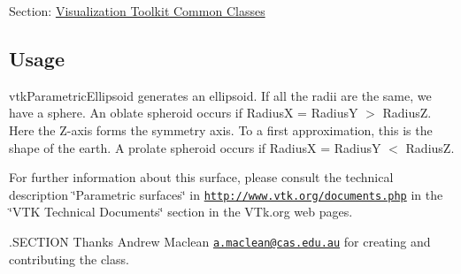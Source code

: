Section\-: \hyperlink{sec_vtkcommon}{Visualization Toolkit Common Classes} \hypertarget{vtkwidgets_vtkxyplotwidget_Usage}{}\subsection{Usage}\label{vtkwidgets_vtkxyplotwidget_Usage}
vtk\-Parametric\-Ellipsoid generates an ellipsoid. If all the radii are the same, we have a sphere. An oblate spheroid occurs if Radius\-X = Radius\-Y $>$ Radius\-Z. Here the Z-\/axis forms the symmetry axis. To a first approximation, this is the shape of the earth. A prolate spheroid occurs if Radius\-X = Radius\-Y $<$ Radius\-Z.

For further information about this surface, please consult the technical description \char`\"{}\-Parametric surfaces\char`\"{} in \href{http://www.vtk.org/documents.php}{\tt http\-://www.\-vtk.\-org/documents.\-php} in the \char`\"{}\-V\-T\-K Technical Documents\char`\"{} section in the V\-Tk.\-org web pages.

.S\-E\-C\-T\-I\-O\-N Thanks Andrew Maclean \href{mailto:a.maclean@cas.edu.au}{\tt a.\-maclean@cas.\-edu.\-au} for creating and contributing the class.

